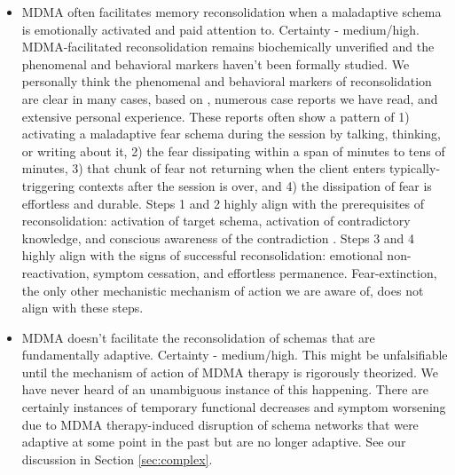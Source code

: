 \documentclass[12pt,letterpaper]{book}
\begin{document}
\begin{itemize}
	\item MDMA often facilitates memory reconsolidation when a maladaptive schema is emotionally activated and paid attention to. Certainty - medium/high. MDMA-facilitated reconsolidation remains biochemically unverified and the phenomenal and behavioral markers haven't been formally studied. We personally think the phenomenal and behavioral markers of reconsolidation are clear in many cases, based on \textcite{fedduciaMDMAMemoryReconsolidation}, numerous case reports we have read, and extensive personal experience. These reports often show a pattern of 1) activating a maladaptive fear schema during the session by talking, thinking, or writing about it, 2) the fear dissipating within a span of minutes to tens of minutes, 3) that chunk of fear not returning when the client enters typically-triggering contexts after the session is over, and 4) the dissipation of fear is effortless and durable. Steps 1 and 2 highly align with the prerequisites of reconsolidation: activation of target schema, activation of contradictory knowledge, and conscious awareness of the contradiction \cite{eckerUnlocking}. Steps 3 and 4 highly align with the signs of successful reconsolidation: emotional non-reactivation, symptom cessation, and effortless permanence. Fear-extinction, the only other mechanistic mechanism of action we are aware of, does not align with these steps.
	\item MDMA doesn't facilitate the reconsolidation of schemas that are fundamentally adaptive. Certainty - medium/high. This might be unfalsifiable until the mechanism of action of MDMA therapy is rigorously theorized. We have never heard of an unambiguous instance of this happening. There are certainly instances of temporary functional decreases and symptom worsening due to MDMA therapy-induced disruption of schema networks that were adaptive at some point in the past but are no longer adaptive. See our discussion in Section \ref{sec:complex}.
\end{itemize}
\end{document}
